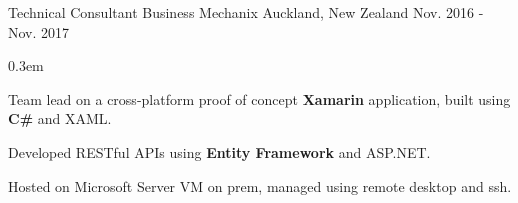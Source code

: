 \begin{cventries}
  \cventry
    {Technical Consultant} %
    {Business Mechanix} %
    {Auckland, New Zealand} %
    {Nov. 2016 - Nov. 2017} %
    {
      \begin{cvitems2} %
        \itemsep0.3em
        \item {Team lead on a cross-platform proof of concept \textbf{Xamarin} application, built using \textbf{C\#} and XAML.}
        \item {Developed RESTful APIs using \textbf{Entity Framework} and ASP.NET.}
        \item {Hosted on Microsoft Server VM on prem, managed using remote desktop and ssh.}
      \end{cvitems2}
    }
    
\end{cventries}
